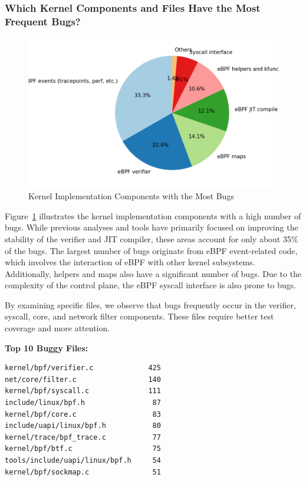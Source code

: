 \subsubsection{Which Kernel Components and Files Have the Most Frequent Bugs?}

\begin{figure}[ht]
    \centering
    \includegraphics[width=\linewidth]{feature-analysis/kernel_components_most_buggy_pie_chart.png}
    \caption{Kernel Implementation Components with the Most Bugs}
    \label{fig:buggy_kernel_component}
\end{figure}

Figure~\ref{fig:buggy_kernel_component} illustrates the kernel implementation components with a high number of bugs. While previous analyses and tools have primarily focused on improving the stability of the verifier and JIT compiler, these areas account for only about 35\% of the bugs. The largest number of bugs originate from eBPF event-related code, which involves the interaction of eBPF with other kernel subsystems. Additionally, helpers and maps also have a significant number of bugs. Due to the complexity of the control plane, the eBPF syscall interface is also prone to bugs.

By examining specific files, we observe that bugs frequently occur in the verifier, syscall, core, and network filter components. These files require better test coverage and more attention.

\textbf{Top 10 Buggy Files:}
\begin{verbatim}
kernel/bpf/verifier.c             425
net/core/filter.c                 140
kernel/bpf/syscall.c              111
include/linux/bpf.h                87
kernel/bpf/core.c                  83
include/uapi/linux/bpf.h           80
kernel/trace/bpf_trace.c           77
kernel/bpf/btf.c                   75
tools/include/uapi/linux/bpf.h     54
kernel/bpf/sockmap.c               51
\end{verbatim}

